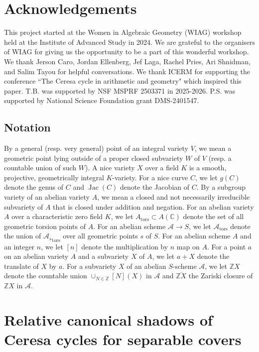 \documentclass[reqno,10pt]{amsart}
\theoremstyle{definition}
\theoremstyle{definition}
\def\C{{\mathbb C}}
\def\Z{{\mathbb Z}}
\def\C{{\mathbb C}}
\DeclareMathOperator{\Jac}{Jac}
\DeclareMathOperator{\tors}{tors}
\begin{document}
\section*{Acknowledgements}
This project started at the Women in Algebraic Geometry (WIAG) workshop held at the Institute of Advanced Study in 2024. We are grateful to the organisers of WIAG for giving us the opportunity to be a part of this wonderful workshop. We thank Jerson Caro,  Jordan Ellenberg, Jef Laga, Rachel Pries, Ari Shnidman, and Salim Tayou for helpful conversations. We thank ICERM for supporting the conference ``The Ceresa cycle in arithmetic and geometry" which  inspired this paper. T.B. was supported by NSF MSPRF 2503371 in 2025-2026. P.S. was supported by National Science Foundation grant DMS-2401547. 


\subsection*{Notation}\label{sec:background}
By a general (resp. very general) point of an integral variety $V$, we mean a geometric point lying outside of a proper closed subvariety $W$ of $V$ (resp. a countable union of such $W$). 
A nice variety $X$ over a field $K$ is a smooth, projective, geometrically integral $K$-variety. For a nice curve $C$, we let $g(C)$ denote the genus of $C$ and $\Jac(C)$ denote the Jacobian of $C$. By a subgroup variety of an abelian variety $A$, we mean a closed and not necessarily irreducible subvariety of $A$ that is closed under addition and negation. For an abelian variety $A$ over a characteristic zero field $K$, we let $A_{\tors} \subset A(\C)$ denote the set of all geometric torsion points of $A$. For an abelian scheme $\mathcal{A} \rightarrow S$, we let $\mathcal{A}_{\tors}$ denote the union of ${\mathcal{A}_s}_{\tors}$ over all geometric points $s$ of $S$. For an abelian scheme $A$ and an integer $n$, we let $[n]$ denote the multiplication by $n$ map on $A$. 
For a point $a$ on an abelian variety $A$ and a subvariety $X$ of $A$, we let $a+X$ denote the translate of $X$ by $a$. 
For a subvariety $X$ of an abelian $S$-scheme $\mathcal{A}$, we let $\Z X$ denote the countable union $\cup_{N \in \Z} [N](X)$ in $\mathcal{A}$ and $\overline{\Z X}$ the Zariski closure of $\Z X$ in $\mathcal{A}$. 

\section{Relative canonical shadows of Ceresa cycles for separable covers}
 
\end{document}
